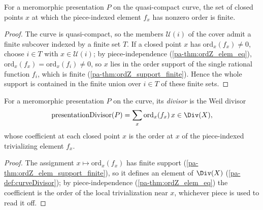 \begin{theorem}
  \label{pa-thm:ordZ_elem_support_finite}
  \leanok

  For a meromorphic presentation \(P\) on the quasi-compact curve, the set of closed points \(x\)
  at which the piece-indexed element \(f_x\) has nonzero order is finite.
\end{theorem}
\begin{proof}
  \leanok
  The curve is quasi-compact, so the members \(\mathcal U(i)\) of the cover admit a finite
  subcover indexed by a finite set \(T\). If a closed point \(x\) has \(\mathrm{ord}_x(f_x) \neq
  0\), choose \(i \in T\) with \(x \in \mathcal U(i)\); by piece-independence
  (\ref{pa-thm:ordZ_elem_eq}), \(\mathrm{ord}_x(f_x) = \mathrm{ord}_x(f_i) \neq 0\), so \(x\) lies in
  the order support of the single rational function \(f_i\), which is finite
  (\ref{pa-thm:ordZ_support_finite}). Hence the whole support is contained in the finite union over
  \(i \in T\) of these finite sets.
\end{proof}

\begin{definition}
  \label{pa-def:presentationDivisor}
  \leanok

  For a meromorphic presentation \(P\) on the curve, its \emph{divisor} is the Weil divisor
  \[
    \mathrm{presentationDivisor}(P) = \sum_x \mathrm{ord}_x(f_x)\, x \in \Div(X),
  \]
  whose coefficient at each closed point \(x\) is the order at \(x\) of the piece-indexed
  trivializing element \(f_x\).
\end{definition}
\begin{proof}
  \leanok
  The assignment \(x \mapsto \mathrm{ord}_x(f_x)\) has finite support
  (\ref{pa-thm:ordZ_elem_support_finite}), so it defines an element of \(\Div(X)\)
  (\ref{pa-def:curveDivisor}); by piece-independence (\ref{pa-thm:ordZ_elem_eq}) the coefficient is the
  order of the local trivialization near \(x\), whichever piece is used to read it off.
\end{proof}

